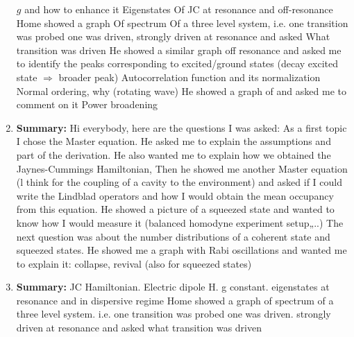 \documentclass{article}%
\begin{document}
\begin{enumerate}
$g$ %
 and how to enhance it\newline%
Eigenstates Of JC at resonance and off{-}resonance\newline%
Home showed a graph Of spectrum Of a three level system, i.e. one transition was probed one was driven, strongly driven at resonance and asked What transition was driven\newline%
He showed a similar graph off resonance and asked me to identify the peaks corresponding to excited/ground states (decay excited state %
$\Rightarrow$ %
 broader peak)\newline%
Autocorrelation function and its normalization\newline%
Normal ordering, why (rotating wave)\newline%
He showed a graph of and asked me to comment on it\newline%
Power broadening%
\item%
\begin{mycolorbox}%
\textbf{Summary:}%
\newline%
Hi everybody, here are the questions I was asked:\newline%
As a first topic I chose the Master equation. He asked me to explain the assumptions and part of the derivation. He also wanted me to explain how we obtained the Jaynes{-}Cummings Hamiltonian,\newline%
Then he showed me another Master equation (l think for the coupling of a cavity to the environment) and asked if I could write the Lindblad operators and how I would obtain the mean occupancy from this equation.\newline%
He showed a picture of a squeezed state and wanted to know how I would measure it (balanced homodyne experiment setup„..)\newline%
The next question was about the number distributions of a coherent state and squeezed states.\newline%
He showed me a graph with Rabi oscillations and wanted me to explain it: collapse, revival (also for squeezed states)%
\end{mycolorbox}%
\item%
\textbf{Summary:}%
\newline%
JC Hamiltonian. Electric dipole H. g constant. eigenstates at resonance and in dispersive regime\newline%
Home showed a graph of spectrum of a three level system. i.e. one transition was probed one was driven. strongly driven at resonance and asked what transition was driven\newline%

\end{enumerate}
\end{document}
